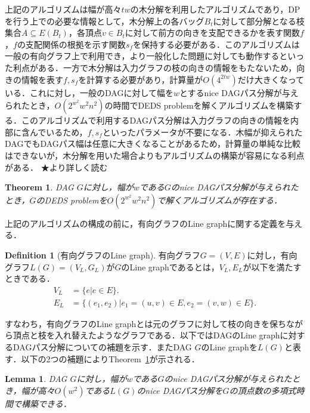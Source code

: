 \documentclass[master]{kuisthesis}		%
\theoremstyle{plain}
\newtheorem{theorem}{Theorem}
\newtheorem{lemma}{Lemma}
\theoremstyle{definition}
\newtheorem{definition*}{Definition}
\begin{document}
上記のアルゴリズムは幅が高々$tw$の木分解を利用したアルゴリズムであり，DPを行う上での必要な情報として，木分解上の各バッグ$B_t$に対して部分解となる枝集合$A\subseteq E(B_t)$，各頂点$v \in B_t$に対して前方の向きを支配できるかを表す関数$f$，$f$の支配関係の根拠を示す関数$s_f$を保持する必要がある．このアルゴリズムは一般の有向グラフ上で利用でき，より一般化した問題に対しても動作するといった利点がある．一方で木分解は入力グラフの枝の向きの情報をもたないため，向きの情報を表す$f, s_f$を計算する必要があり，計算量が$O(4^{2tw})$だけ大きくなっている．これに対し，一般のDAGに対して幅を$w$とするnice DAGパス分解が与えられたとき，$O(2^{w^2}w^2n^2)$の時間でDEDS problemを解くアルゴリズムを構築する．このアルゴリズムで利用するDAGパス分解は入力グラフの向きの情報を内部に含んでいるため，$f, s_f$といったパラメータが不要になる．木幅が抑えられたDAGでもDAGパス幅は任意に大きくなることがあるため，計算量の単純な比較はできないが，木分解を用いた場合よりもアルゴリズムの構築が容易になる利点がある．
★より詳しく読む

\begin{theorem}\label{DEDS_FPT}
    DAG $G$に対し，幅が$w$である$G$のnice DAGパス分解が与えられたとき，$G$のDEDS problemを$O(2^{w^2}w^2n^2)$で解くアルゴリズムが存在する．
\end{theorem}

上記のアルゴリズムの構成の前に，有向グラフのLine graphに関する定義を与える．

\begin{definition*}[有向グラフのLine graph]
    有向グラフ$G=(V, E)$に対し，有向グラフ$L(G)=(V_L, G_L)$が$G$のLine graphであるとは，$V_L, E_L$が以下を満たすときである．
    \begin{align*}
        V_L &= \{e | e\in E\}.\\
        E_L &= \{(e_1, e_2) | e_1=(u, v)\in E, e_2=(v, w)\in E\}.
    \end{align*}
\end{definition*}

すなわち，有向グラフのLine graphとは元のグラフに対して枝の向きを保ちながら頂点と枝を入れ替えたようなグラフである．以下ではDAGのLine graphに対するDAGパス分解についての補題を示す．またDAG $G$のLine graphを$L(G)$と表す．以下の2つの補題によりTheorem~\ref{DEDS_FPT}が示される．

\begin{lemma}\label{DAGパス分解(L(G))}
    DAG $G$に対し，幅が$w$である$G$のnice DAGパス分解が与えられたとき，幅が高々$O(w^2)$である$L(G)$のnice DAGパス分解を$G$の頂点数の多項式時間で構築できる．
\end{lemma}
\end{document}
